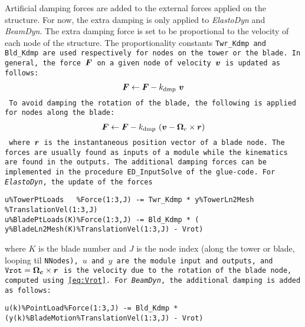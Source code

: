 \documentclass[11pt]{article}
\begin{document}
\label{sec:damping}
Artificial damping forces are added to the external forces applied on the structure.
For now, the extra damping is only applied to \textit{ElastoDyn} and \textit{BeamDyn}.
% 
The extra damping force is set to be proportional to the velocity of each node of the structure. The proportionality constants \tt{Twr\_Kdmp} and \tt{Bld\_Kdmp} are used respectively for nodes on the tower or the blade. 
% 
In general, the force $\boldsymbol{F}$ on a given node of velocity $\boldsymbol{v}$ is updated as follows:
\begin{align}
    \boldsymbol{F} \leftarrow  \boldsymbol{F}  -  k_\text{dmp}\  \boldsymbol{v}
\end{align}
To avoid damping the rotation of the blade, the following is applied for nodes along the blade:
\begin{align}
    \boldsymbol{F} \leftarrow  \boldsymbol{F}  -  k_\text{dmp}\  (\boldsymbol{v}-\boldsymbol{\Omega}_c\times \boldsymbol{r})
\end{align}
where $\boldsymbol{r}$ is the instantaneous position vector of a blade node.
The forces are usually found as inputs of a module while the kinematics are found in the outputs. 
% 
The additional damping forces can be implemented in the procedure \tt{ED\_InputSolve} of the glue-code.
For \textit{ElastoDyn}, the update of the forces 
\begin{lstlisting}
u%TowerPtLoads   %Force(1:3,J) -= Twr_Kdmp * y%TowerLn2Mesh   %TranslationVel(1:3,J)
u%BladePtLoads(K)%Force(1:3,J) -= Bld_Kdmp * ( y%BladeLn2Mesh(K)%TranslationVel(1:3,J) - Vrot)
\end{lstlisting}
where $K$ is the blade number and $J$ is the node index (along the tower or blade, looping til \tt{NNodes}), $u$ and $y$ are the module input and outputs, and $\texttt{Vrot}=\boldsymbol{\Omega_c}\times\boldsymbol{r}$
is the velocity due to the rotation of the blade node, computed using \autoref{eq:Vrot}.
For \textit{BeamDyn}, the additional damping is added as follows:
\begin{lstlisting}
u(k)%PointLoad%Force(1:3,J) -= Bld_Kdmp * (y(k)%BladeMotion%TranslationVel(1:3,J) - Vrot)
\end{lstlisting}
\end{document}
